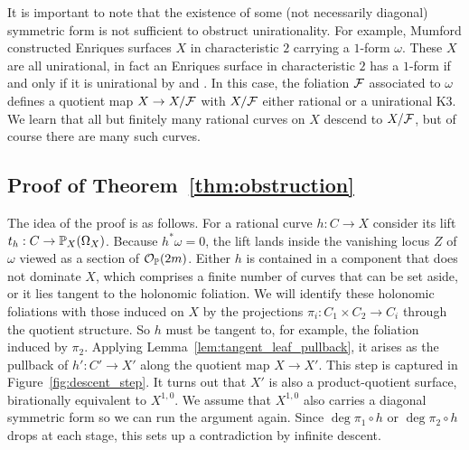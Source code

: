 \documentclass[main.tex]{subfiles}
\begin{document}
\begin{example}
It is important to note that the existence of some (not necessarily diagonal) symmetric form is not sufficient to obstruct unirationality. For example, Mumford  \cite{mumford:pathologies} constructed Enriques surfaces $X$ in characteristic $2$ carrying a $1$-form $\omega$. These $X$ are all unirational, in fact an Enriques surface in characteristic $2$ has a $1$-form if and only if it is unirational by \cite[Proposition 1.3.8]{cossec:enriques_surfaces} and \cite{liedtke:enriques_unirational}. In this case, the foliation $\F$ associated to $\omega$ defines a quotient map $X \to X / \F$ with $X / \F$ either rational or a unirational K3. We learn that all but finitely many rational curves on $X$ descend to $X / \F$, but of course there are many such curves. 
\end{example}


\subsection{Proof of Theorem~\ref{thm:obstruction}}

The idea of the proof is as follows. For a rational curve $h : C \to X$ consider its lift $t_h :  C \to \P_X(\Omega_X)$. Because $h^* \omega = 0$, the lift lands inside the vanishing locus $Z$ of $\omega$ viewed as a section of $\cO_{\P}(2m)$. Either $h$ is contained in a component that does not dominate $X$, which comprises a finite number of curves that can be set aside, or it lies tangent to the holonomic foliation. We will identify these holonomic foliations with those induced on $X$ by the projections $\pi_i : C_1 \times C_2 \to C_i$ through the quotient structure. So $h$ must be tangent to, for example, the foliation induced by $\pi_2$. Applying Lemma~\ref{lem:tangent_leaf_pullback}, it arises as the pullback of $h' : C' \to X'$ along the quotient map $X \to X'$. This step is captured in Figure~\ref{fig:descent_step}. It turns out that $X'$ is also a product-quotient surface, birationally equivalent to $X^{1,0}$. We assume that $X^{1,0}$ also carries a diagonal symmetric form so we can run the argument again. Since $\deg{\pi_1 \circ h}$ or $\deg{\pi_2 \circ h}$ drops at each stage, this sets up a contradiction by infinite descent. 
\end{document}
